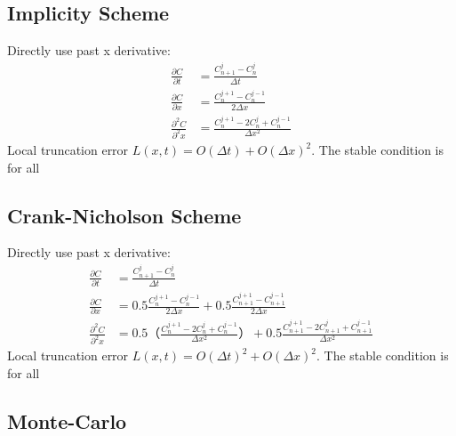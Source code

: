 \subsection{Implicity Scheme}
Directly use past x derivative:
\begin{equation}
\begin{aligned}
\frac{\partial C}{\partial t} &= \frac{C^j_{n+1} - C^j_{n}}{\Delta t} \\
\frac{\partial C}{\partial x} &= \frac{C^{j+1}_{n} - C^{j-1}_{n}}{2 \Delta x}\\
\frac{\partial^2 C}{\partial^2 x} &= \frac{C^{j+1}_{n} -2C^{j}_{n}+ C^{j-1}_{n}}{\Delta x ^2}
\end{aligned}
\end{equation}
Local truncation error $L(x,t) = O(\Delta t) + O(\Delta x)^2$. The stable condition is for all

\subsection{Crank-Nicholson Scheme}
Directly use past x derivative:
\begin{equation}
\begin{aligned}
\frac{\partial C}{\partial t} &= \frac{C^j_{n+1} - C^j_{n}}{\Delta t} \\
\frac{\partial C}{\partial x} &= 0.5 \frac{C^{j+1}_{n} - C^{j-1}_{n}}{2 \Delta x} + 0.5 \frac{C^{j+1}_{n+1} - C^{j-1}_{n+1}}{2 \Delta x}\\
\frac{\partial^2 C}{\partial^2 x} &= 0.5 （\frac{C^{j+1}_{n} -2C^{j}_{n}+ C^{j-1}_{n}}{\Delta x ^2}） + 0.5 \frac{C^{j+1}_{n+1} -2C^{j}_{n+1}+ C^{j-1}_{n+1}}{\Delta x ^2}
\end{aligned}
\end{equation}
Local truncation error $L(x,t) = O(\Delta t)^2 + O(\Delta x)^2$. The stable condition is for all


\subsection{Monte-Carlo}
